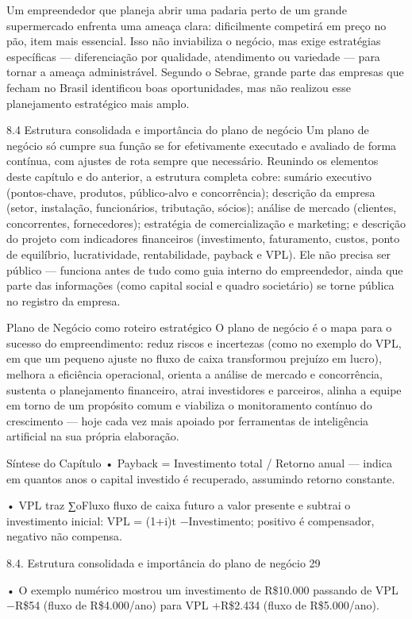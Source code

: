 Um empreendedor que planeja abrir uma padaria perto de um grande supermercado enfrenta uma ameaça clara: dificilmente competirá em preço no pão, item mais essencial. Isso não inviabiliza o negócio, mas exige estratégias específicas — diferenciação por qualidade, atendimento ou variedade — para tornar a ameaça administrável. Segundo o Sebrae, grande parte das empresas que fecham no Brasil identificou boas oportunidades, mas não realizou esse planejamento estratégico mais amplo.

8.4 Estrutura consolidada e importância do plano de negócio Um plano de negócio só cumpre sua função se for efetivamente executado e avaliado de forma contínua, com ajustes de rota sempre que necessário. Reunindo os elementos deste capítulo e do anterior, a estrutura completa cobre: sumário executivo (pontos-chave, produtos, público-alvo e concorrência); descrição da empresa (setor, instalação, funcionários, tributação, sócios); análise de mercado (clientes, concorrentes, fornecedores); estratégia de comercialização e marketing; e descrição do projeto com indicadores financeiros (investimento, faturamento, custos, ponto de equilíbrio, lucratividade, rentabilidade, payback e VPL). Ele não precisa ser público — funciona antes de tudo como guia interno do empreendedor, ainda que parte das informações (como capital social e quadro societário) se torne pública no registro da empresa.

Plano de Negócio como roteiro estratégico O plano de negócio é o mapa para o sucesso do empreendimento: reduz riscos e incertezas (como no exemplo do VPL, em que um pequeno ajuste no fluxo de caixa transformou prejuízo em lucro), melhora a eficiência operacional, orienta a análise de mercado e concorrência, sustenta o planejamento financeiro, atrai investidores e parceiros, alinha a equipe em torno de um propósito comum e viabiliza o monitoramento contínuo do crescimento — hoje cada vez mais apoiado por ferramentas de inteligência artificial na sua própria elaboração.

Síntese do Capítulo • Payback = Investimento total / Retorno anual — indica em quantos anos o capital investido é recuperado, assumindo retorno constante.

• VPL traz ∑oFluxo fluxo de caixa futuro a valor presente e subtrai o investimento inicial: VPL = (1+i)t −Investimento; positivo é compensador, negativo não compensa.

8.4. Estrutura consolidada e importância do plano de negócio 29

• O exemplo numérico mostrou um investimento de R\$10.000 passando de VPL −R\$54 (fluxo de R\$4.000/ano) para VPL +R\$2.434 (fluxo de R\$5.000/ano).

